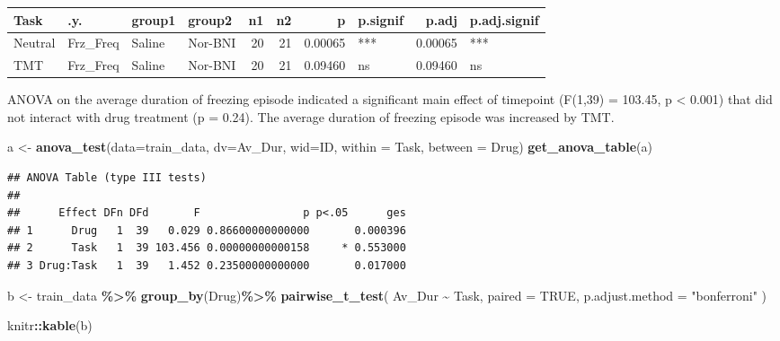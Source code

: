 \documentclass[
]{book}
\newenvironment{Shaded}{\begin{snugshade}}{\end{snugshade}}
\newcommand{\AttributeTok}[1]{\textcolor[rgb]{0.13,0.29,0.53}{#1}}
\newcommand{\ConstantTok}[1]{\textcolor[rgb]{0.56,0.35,0.01}{#1}}
\newcommand{\FunctionTok}[1]{\textcolor[rgb]{0.13,0.29,0.53}{\textbf{#1}}}
\newcommand{\NormalTok}[1]{#1}
\newcommand{\OtherTok}[1]{\textcolor[rgb]{0.56,0.35,0.01}{#1}}
\newcommand{\SpecialCharTok}[1]{\textcolor[rgb]{0.81,0.36,0.00}{\textbf{#1}}}
\newcommand{\StringTok}[1]{\textcolor[rgb]{0.31,0.60,0.02}{#1}}
\begin{document}
\begin{tabular}{l|l|l|l|r|r|r|l|r|l}
\hline
Task & .y. & group1 & group2 & n1 & n2 & p & p.signif & p.adj & p.adj.signif\\
\hline
Neutral & Frz\_Freq & Saline & Nor-BNI & 20 & 21 & 0.00065 & *** & 0.00065 & ***\\
\hline
TMT & Frz\_Freq & Saline & Nor-BNI & 20 & 21 & 0.09460 & ns & 0.09460 & ns\\
\hline
\end{tabular}

ANOVA on the average duration of freezing episode indicated a significant main effect of timepoint (F(1,39) = 103.45, p \textless{} 0.001) that did not interact with drug treatment (p = 0.24). The average duration of freezing episode was increased by TMT.

\begin{Shaded}
\begin{Highlighting}[]
\NormalTok{a }\OtherTok{\textless{}{-}} \FunctionTok{anova\_test}\NormalTok{(}\AttributeTok{data=}\NormalTok{train\_data, }\AttributeTok{dv=}\NormalTok{Av\_Dur, }\AttributeTok{wid=}\NormalTok{ID, }\AttributeTok{within =}\NormalTok{ Task, }\AttributeTok{between =}\NormalTok{ Drug)}
\FunctionTok{get\_anova\_table}\NormalTok{(a)}
\end{Highlighting}
\end{Shaded}

\begin{verbatim}
## ANOVA Table (type III tests)
## 
##      Effect DFn DFd       F                p p<.05      ges
## 1      Drug   1  39   0.029 0.86600000000000       0.000396
## 2      Task   1  39 103.456 0.00000000000158     * 0.553000
## 3 Drug:Task   1  39   1.452 0.23500000000000       0.017000
\end{verbatim}

\begin{Shaded}
\begin{Highlighting}[]
\NormalTok{b }\OtherTok{\textless{}{-}}\NormalTok{ train\_data }\SpecialCharTok{\%\textgreater{}\%}
  \FunctionTok{group\_by}\NormalTok{(Drug)}\SpecialCharTok{\%\textgreater{}\%}
  \FunctionTok{pairwise\_t\_test}\NormalTok{(}
\NormalTok{  Av\_Dur }\SpecialCharTok{\textasciitilde{}}\NormalTok{ Task, }\AttributeTok{paired =} \ConstantTok{TRUE}\NormalTok{,}
  \AttributeTok{p.adjust.method =} \StringTok{"bonferroni"}
\NormalTok{  )}

\NormalTok{knitr}\SpecialCharTok{::}\FunctionTok{kable}\NormalTok{(b)}
\end{Highlighting}
\end{Shaded}
\end{document}
